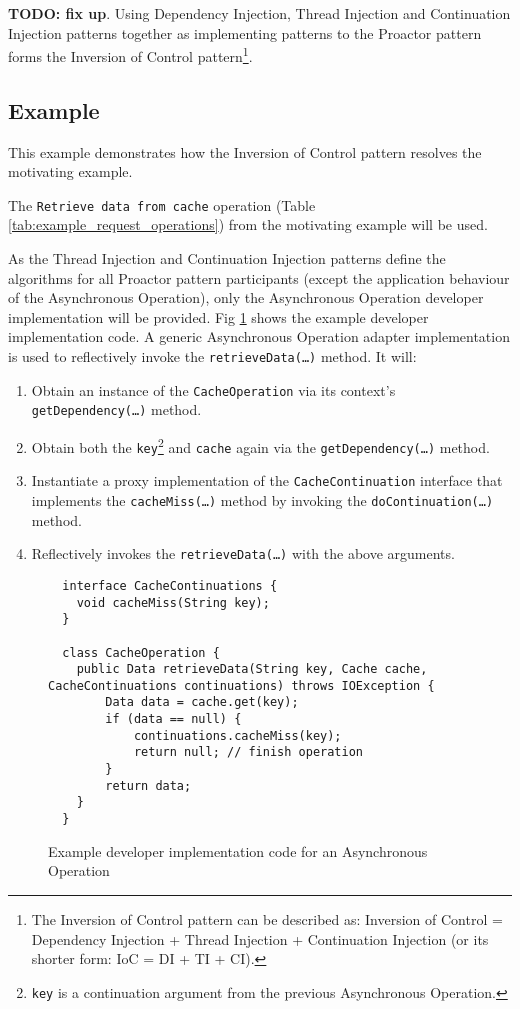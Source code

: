 \documentclass[prodmode]{style/acmlarge}
\begin{document}
\textbf{TODO: fix up}.  Using Dependency Injection, Thread Injection and Continuation Injection patterns
together as implementing patterns to the Proactor pattern forms the Inversion of
Control pattern\footnote{The Inversion of Control pattern can be
described as:  Inversion of Control = Dependency Injection + Thread Injection +
Continuation Injection (or its shorter form: IoC = DI + TI + CI).}.


\subsection{Example}

This example demonstrates how the Inversion of Control pattern resolves the
motivating example.

The \texttt{Retrieve data from cache} operation (Table
\ref{tab:example_request_operations}) from the motivating example will be used.  

As the Thread Injection and Continuation Injection patterns define the
algorithms for all Proactor pattern participants (except the application
behaviour of the Asynchronous Operation), only the Asynchronous Operation
developer implementation will be provided.  Fig
\ref{fig:Example_Method_Operation} shows the example developer implementation
code.  A generic Asynchronous Operation adapter implementation is used to
reflectively invoke the \texttt{retrieveData(\ldots)} method. It will:
\begin{enumerate}
  \item Obtain an instance of the \texttt{CacheOperation} via its context's \texttt{getDependency(\ldots)} method.
  \item Obtain both the \texttt{key}\footnote{\texttt{key} is a continuation argument from the previous Asynchronous Operation.} and \texttt{cache} again via the \texttt{getDependency(\ldots)} method.
  \item Instantiate a proxy implementation of the \texttt{CacheContinuation} interface that implements the \texttt{cacheMiss(\ldots)} method by invoking the \texttt{doContinuation(\ldots)} method. 
  \item Reflectively invokes the \texttt{retrieveData(\ldots)} with the above arguments.
\end{enumerate}

\begin{figure}[tp]
\centering
\begin{verbatim}
  interface CacheContinuations {
    void cacheMiss(String key);
  }

  class CacheOperation {    
    public Data retrieveData(String key, Cache cache, CacheContinuations continuations) throws IOException {
        Data data = cache.get(key);
        if (data == null) {
            continuations.cacheMiss(key);
            return null; // finish operation
        }
        return data;
    }
  }
\end{verbatim}
\caption{Example developer implementation code for an Asynchronous Operation}
\label{fig:Example_Method_Operation}
\end{figure}
\end{document}
